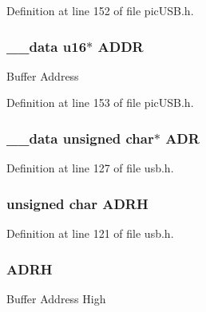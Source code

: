 Definition at line 152 of file pic\-U\-S\-B.\-h.

\hypertarget{union_buffer_descriptor_table_ae370db99fcc6c8e4871c20ccfb6959f3}{
\subsubsection[{A\-D\-D\-R}]{\setlength{\rightskip}{0pt plus 5cm}\-\_\-\-\_\-data {\bf u16}$\ast$ A\-D\-D\-R}}\label{union_buffer_descriptor_table_ae370db99fcc6c8e4871c20ccfb6959f3}
Buffer Address 

Definition at line 153 of file pic\-U\-S\-B.\-h.

\hypertarget{union_buffer_descriptor_table_af9ea67355f60478b33f33e36a1fde262}{
\subsubsection[{A\-D\-R}]{\setlength{\rightskip}{0pt plus 5cm}\-\_\-\-\_\-data unsigned char$\ast$ A\-D\-R}}\label{union_buffer_descriptor_table_af9ea67355f60478b33f33e36a1fde262}


Definition at line 127 of file usb.\-h.

\hypertarget{union_buffer_descriptor_table_a88fd75c8c3e937291a788423a7958b8d}{
\subsubsection[{A\-D\-R\-H}]{\setlength{\rightskip}{0pt plus 5cm}unsigned char A\-D\-R\-H}}\label{union_buffer_descriptor_table_a88fd75c8c3e937291a788423a7958b8d}


Definition at line 121 of file usb.\-h.

\hypertarget{union_buffer_descriptor_table_a4a0bc5412324724c0f8ee123276dc88b}{
\subsubsection[{A\-D\-R\-H}]{ A\-D\-R\-H}}\label{union_buffer_descriptor_table_a4a0bc5412324724c0f8ee123276dc88b}
Buffer Address High 

